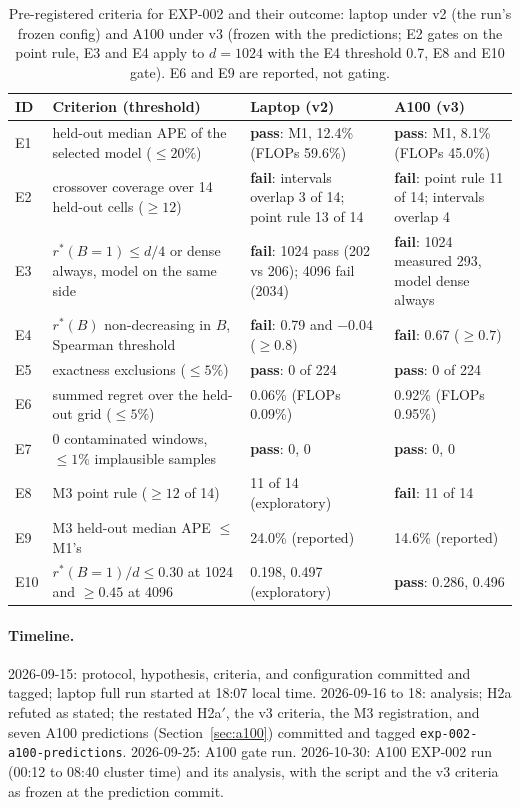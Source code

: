 \documentclass{article}
\newcommand{\rstar}{r^{*}}
\begin{document}
\begin{table}[t]
\caption{Pre-registered criteria for EXP-002 and their outcome: laptop under v2 (the run's frozen config) and A100 under v3 (frozen with the predictions; E2 gates on the point rule, E3 and E4 apply to $d = 1024$ with the E4 threshold 0.7, E8 and E10 gate). E6 and E9 are reported, not gating.}
\label{tab:criteria}
\vskip 0.1in
\centering
\footnotesize
\begin{tabular}{@{}lp{6.2cm}p{4.6cm}p{4.6cm}@{}}
\toprule
ID & Criterion (threshold) & Laptop (v2) & A100 (v3) \\
\midrule
E1 & held-out median APE of the selected model ($\leq 20\%$) & \textbf{pass}: M1, 12.4\% (FLOPs 59.6\%) & \textbf{pass}: M1, 8.1\% (FLOPs 45.0\%) \\
E2 & crossover coverage over 14 held-out cells ($\geq 12$) & \textbf{fail}: intervals overlap 3 of 14; point rule 13 of 14 & \textbf{fail}: point rule 11 of 14; intervals overlap 4 \\
E3 & $\rstar(B{=}1) \leq d/4$ or dense always, model on the same side & \textbf{fail}: 1024 pass (202 vs 206); 4096 fail (2034) & \textbf{fail}: 1024 measured 293, model dense always \\
E4 & $\rstar(B)$ non-decreasing in $B$, Spearman threshold & \textbf{fail}: 0.79 and $-0.04$ ($\geq 0.8$) & \textbf{fail}: 0.67 ($\geq 0.7$) \\
E5 & exactness exclusions ($\leq 5\%$) & \textbf{pass}: 0 of 224 & \textbf{pass}: 0 of 224 \\
E6 & summed regret over the held-out grid ($\leq 5\%$) & 0.06\% (FLOPs 0.09\%) & 0.92\% (FLOPs 0.95\%) \\
E7 & 0 contaminated windows, $\leq 1\%$ implausible samples & \textbf{pass}: 0, 0 & \textbf{pass}: 0, 0 \\
E8 & M3 point rule ($\geq 12$ of 14) & 11 of 14 (exploratory) & \textbf{fail}: 11 of 14 \\
E9 & M3 held-out median APE $\leq$ M1's & 24.0\% (reported) & 14.6\% (reported) \\
E10 & $\rstar(B{=}1)/d \leq 0.30$ at 1024 and $\geq 0.45$ at 4096 & 0.198, 0.497 (exploratory) & \textbf{pass}: 0.286, 0.496 \\
\bottomrule
\end{tabular}
\end{table}

\paragraph{Timeline.} 2026-09-15: protocol, hypothesis, criteria, and configuration committed and tagged; laptop full run started at 18:07 local time. 2026-09-16 to 18: analysis; H2a refuted as stated; the restated H2a$'$, the v3 criteria, the M3 registration, and seven A100 predictions (Section~\ref{sec:a100}) committed and tagged \texttt{exp-002-a100-predictions}. 2026-09-25: A100 gate run. 2026-10-30: A100 EXP-002 run (00:12 to 08:40 cluster time) and its analysis, with the script and the v3 criteria as frozen at the prediction commit.
\end{document}
